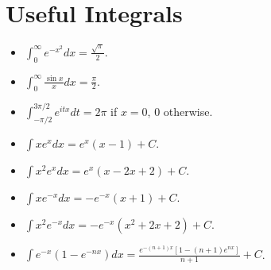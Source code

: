 \documentclass[twoside]{article}
\newcommand{\dis}{\displaystyle}
\begin{document}
\section{Useful Integrals}
\begin{itemize}
\item $\displaystyle\int_0^\infty e^{-x^2}dx = \frac{\sqrt{\pi}}{2}$.

\item $\displaystyle\int_0^\infty\frac{\sin x}{x}dx = \frac{\pi}{2}$.

\item $\dis\int_{-\pi/2}^{3\pi/2} e^{itx} dt = 2\pi$ if $x = 0$, 0 otherwise.

\item $\dis\int xe^x dx = e^x(x-1) + C$.

\item $\dis\int x^2e^x dx = e^x(x-2x+2) + C$.

\item $\dis\int xe^{-x} dx = -e^{-x}(x+1) + C$.

\item $\dis\int x^2 e^{-x} dx = -e^{-x}(x^2+2x+2) + C$.

\item $\dis\int e^{-x}(1-e^{-nx})dx = \dis\frac{e^{-(n+1)x}[1 - (n+1)e^{nx}]}{n+1} + C$.
\end{itemize}
\end{document}
